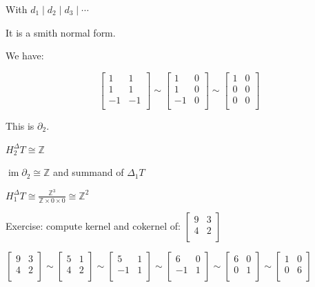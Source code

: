 \documentclass{article}
\theoremstyle{definition}
\begin{document}
    With \(d_1 \mid d_2 \mid d_3 \mid \cdots\) 

    It is a smith normal form.

    We have:

    \[
        \begin{bmatrix}
            1 & 1 \\
            1 & 1 \\
            -1 & -1 \\
        \end{bmatrix} \sim \begin{bmatrix}
            1 & 0 \\
            1 & 0 \\
            -1 & 0 \\
        \end{bmatrix} \sim \begin{bmatrix}
            1 & 0 \\
            0 & 0 \\
            0 & 0 \\
        \end{bmatrix} 
    \]

    This is \(\partial_2\).

    \(H_2^\Delta T \cong \mathbb{Z}\) 

    \(\operatorname{im} \partial_2 \cong \mathbb{Z}\) and summand of \(\Delta_1 T\)

    \(H_1^\Delta T \cong \frac{\mathbb{Z}^3}{\mathbb{Z} \times 0 \times 0} \cong \mathbb{Z}^2\) 

    Exercise: compute kernel and cokernel of: \(\begin{bmatrix}
        9 & 3 \\
        4 & 2 \\
    \end{bmatrix} \) 

    \(\begin{bmatrix}
        9 & 3 \\
        4 & 2 \\
    \end{bmatrix} \sim \begin{bmatrix}
        5 & 1 \\
        4 & 2 \\
    \end{bmatrix} \sim \begin{bmatrix}
        5 & 1 \\
        -1 & 1 \\
    \end{bmatrix} \sim \begin{bmatrix}
        6 & 0 \\
        -1 & 1 \\
    \end{bmatrix} \sim \begin{bmatrix}
        6 & 0 \\
        0 & 1 \\
    \end{bmatrix} \sim \begin{bmatrix}
        1 & 0 \\
        0 & 6 \\
    \end{bmatrix} \) 
\end{document}
